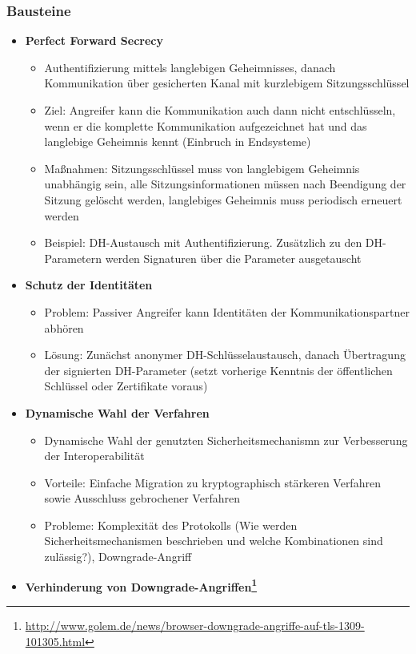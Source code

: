\subsubsection{Bausteine}
\begin{itemize}
	\item \textbf{Perfect Forward Secrecy}
	\begin{itemize}
		\item Authentifizierung mittels langlebigen Geheimnisses, danach Kommunikation über gesicherten Kanal mit kurzlebigem Sitzungsschlüssel
		\item Ziel: Angreifer kann die Kommunikation auch dann nicht entschlüsseln, wenn er die komplette Kommunikation aufgezeichnet hat und das langlebige Geheimnis kennt (Einbruch in Endsysteme)
		\item Maßnahmen: Sitzungsschlüssel muss von langlebigem Geheimnis unabhängig sein, alle Sitzungsinformationen müssen nach Beendigung der Sitzung gelöscht werden, langlebiges Geheimnis muss periodisch erneuert werden
		\item Beispiel: DH-Austausch mit Authentifizierung. Zusätzlich zu den DH-Parametern werden Signaturen über die Parameter ausgetauscht
	\end{itemize}
	\item \textbf{Schutz der Identitäten}
	\begin{itemize}
		\item Problem: Passiver Angreifer kann Identitäten der Kommunikationspartner abhören
		\item Lösung: Zunächst anonymer DH-Schlüsselaustausch, danach Übertragung der signierten DH-Parameter (setzt vorherige Kenntnis der öffentlichen Schlüssel oder Zertifikate voraus)
	\end{itemize}
	\item \textbf{Dynamische Wahl der Verfahren}
	\begin{itemize}
		\item Dynamische Wahl der genutzten Sicherheitsmechanismn zur Verbesserung der Interoperabilität
		\item Vorteile: Einfache Migration zu kryptographisch stärkeren Verfahren sowie Ausschluss gebrochener Verfahren
		\item Probleme: Komplexität des Protokolls (Wie werden Sicherheitsmechanismen beschrieben und welche Kombinationen sind zulässig?), Downgrade-Angriff
	\end{itemize}
	\item \textbf{Verhinderung von Downgrade-Angriffen\footnote{\url{http://www.golem.de/news/browser-downgrade-angriffe-auf-tls-1309-101305.html}}}

\end{itemize}
